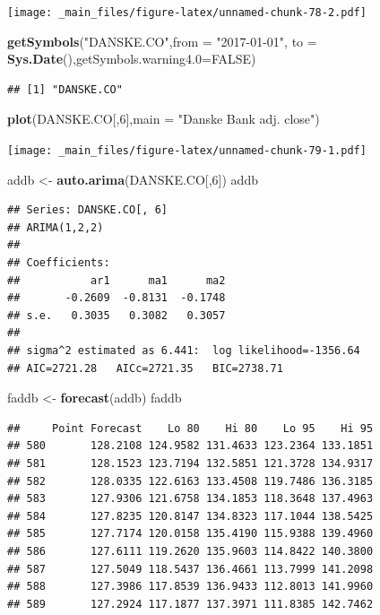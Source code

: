 \documentclass[]{book}
\newenvironment{Shaded}{\begin{snugshade}}{\end{snugshade}}
\newcommand{\DataTypeTok}[1]{\textcolor[rgb]{0.13,0.29,0.53}{#1}}
\newcommand{\DecValTok}[1]{\textcolor[rgb]{0.00,0.00,0.81}{#1}}
\newcommand{\KeywordTok}[1]{\textcolor[rgb]{0.13,0.29,0.53}{\textbf{#1}}}
\newcommand{\NormalTok}[1]{#1}
\newcommand{\OtherTok}[1]{\textcolor[rgb]{0.56,0.35,0.01}{#1}}
\newcommand{\StringTok}[1]{\textcolor[rgb]{0.31,0.60,0.02}{#1}}
\begin{document}
\texttt{[image: \_main\_files/figure-latex/unnamed-chunk-78-2.pdf]}

\begin{Shaded}
\begin{Highlighting}[]
\KeywordTok{getSymbols}\NormalTok{(}\StringTok{"DANSKE.CO"}\NormalTok{,}\DataTypeTok{from =} \StringTok{"2017-01-01"}\NormalTok{, }\DataTypeTok{to =} \KeywordTok{Sys.Date}\NormalTok{(),}\DataTypeTok{getSymbols.warning4.0=}\OtherTok{FALSE}\NormalTok{)}
\end{Highlighting}
\end{Shaded}

\begin{verbatim}
## [1] "DANSKE.CO"
\end{verbatim}

\begin{Shaded}
\begin{Highlighting}[]
\KeywordTok{plot}\NormalTok{(DANSKE.CO[,}\DecValTok{6}\NormalTok{],}\DataTypeTok{main =} \StringTok{"Danske Bank adj. close"}\NormalTok{)}
\end{Highlighting}
\end{Shaded}

\texttt{[image: \_main\_files/figure-latex/unnamed-chunk-79-1.pdf]}

\begin{Shaded}
\begin{Highlighting}[]
\NormalTok{addb <-}\StringTok{ }\KeywordTok{auto.arima}\NormalTok{(DANSKE.CO[,}\DecValTok{6}\NormalTok{])}
\NormalTok{addb}
\end{Highlighting}
\end{Shaded}

\begin{verbatim}
## Series: DANSKE.CO[, 6] 
## ARIMA(1,2,2) 
## 
## Coefficients:
##           ar1      ma1      ma2
##       -0.2609  -0.8131  -0.1748
## s.e.   0.3035   0.3082   0.3057
## 
## sigma^2 estimated as 6.441:  log likelihood=-1356.64
## AIC=2721.28   AICc=2721.35   BIC=2738.71
\end{verbatim}

\begin{Shaded}
\begin{Highlighting}[]
\NormalTok{faddb <-}\StringTok{ }\KeywordTok{forecast}\NormalTok{(addb)}
\NormalTok{faddb}
\end{Highlighting}
\end{Shaded}

\begin{verbatim}
##     Point Forecast    Lo 80    Hi 80    Lo 95    Hi 95
## 580       128.2108 124.9582 131.4633 123.2364 133.1851
## 581       128.1523 123.7194 132.5851 121.3728 134.9317
## 582       128.0335 122.6163 133.4508 119.7486 136.3185
## 583       127.9306 121.6758 134.1853 118.3648 137.4963
## 584       127.8235 120.8147 134.8323 117.1044 138.5425
## 585       127.7174 120.0158 135.4190 115.9388 139.4960
## 586       127.6111 119.2620 135.9603 114.8422 140.3800
## 587       127.5049 118.5437 136.4661 113.7999 141.2098
## 588       127.3986 117.8539 136.9433 112.8013 141.9960
## 589       127.2924 117.1877 137.3971 111.8385 142.7462
\end{verbatim}
\end{document}

